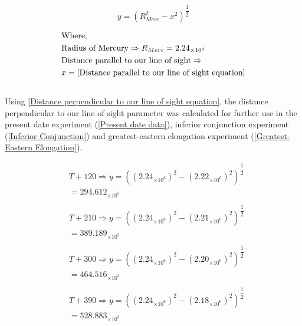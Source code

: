 \documentclass[11pt]{article}
\begin{document}
\begin{multicols}{2}
\begin{equation} \label{Distance perpendicular to our line of sight equation}
{y = (R_{Merc}^{2} - x^{2})^{\dfrac{1}{2}}}
\end{equation}

\begin{equation*}
\begin{split}
&\text{Where;} \\
&\text{Radius of Mercury} \Rightarrow {R_{Merc}}=2.24_{\times10^6} \\
&\text{Distance parallel to our line of sight} \Rightarrow \\
& x= \cref{Distance parallel to our line of sight equation} \\
\end{split}
\end{equation*} \\

Using \cref{Distance perpendicular to our line of sight equation}, the distance perpendicular to our line of sight parameter was calculated for further use in the present date experiment (\cref{Present date data}), inferior conjunction experiment (\cref{Inferior Conjunction}) and greatest-eastern elongation experiment (\cref{Greatest-Eastern Elongation}). 

\begin{equation}\label{Distance perpendicular to our line of sight parameter}
\begin{split}
&T + 120 \Rightarrow {y=((2.24_{\times10^6})^{2} - (2.22_{\times10^6})^{2})^{\dfrac{1}{2}}} \\
&=294.612_{\times10^3} \\
\\
&T + 210 \Rightarrow {y=((2.24_{\times10^6})^{2} - (2.21_{\times10^6})^{2})^{\dfrac{1}{2}}} \\ 
&=389.189_{\times10^3} \\
\\
&T + 300 \Rightarrow {y=((2.24_{\times10^6})^{2} - (2.20_{\times10^6})^{2})^{\dfrac{1}{2}}} \\ 
&=464.516_{\times10^3} \\
\\
&T + 390 \Rightarrow {y=((2.24_{\times10^6})^{2} - (2.18_{\times10^6})^{2})^{\dfrac{1}{2}}} \\ 
&=528.883_{\times10^3} \\
\\
\end{split}
\end{equation}


\end{multicols}
\end{document}
